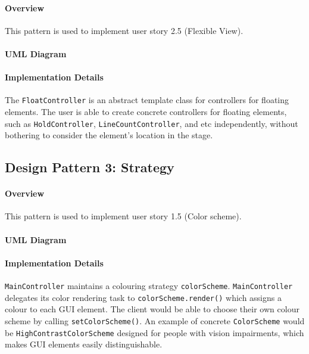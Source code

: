 \documentclass{article}
\begin{document}
\paragraph{Overview}
This pattern is used to implement user story 2.5 (Flexible View).

\paragraph{UML Diagram}\hfill

\begin{figure}[H]
    
\end{figure}

\paragraph{Implementation Details}

The \verb`FloatController` is an abstract template class for controllers for floating elements. The user is able to create concrete controllers for floating elements, such as \verb`HoldController`, \verb`LineCountController`, and etc independently, without bothering to consider the element's location in the stage.

\clearpage

\subsection{Design Pattern 3: Strategy}

\paragraph{Overview}
This pattern is used to implement user story 1.5 (Color scheme).

\paragraph{UML Diagram}\hfill

\begin{figure}[H]
    
\end{figure}

\paragraph{Implementation Details}

\verb`MainController` maintains a colouring strategy \verb`colorScheme`. \verb`MainController` delegates its color rendering task to \verb`colorScheme.render()` which assigns a colour to each GUI element. The client would be able to choose their own colour scheme by calling \verb|setColorScheme()|. An example of concrete \verb|ColorScheme| would be \verb`HighContrastColorScheme` designed for people with vision impairments, which makes GUI elements easily distinguishable.
\end{document}
